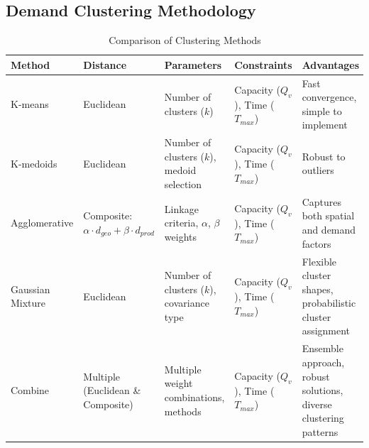 \subsection{Demand Clustering Methodology} \label{app:data:clustering}

\begin{table}[h]
\centering
\begin{tabular}{>{\raggedright}p{2.2cm}p{2.1cm}p{2.8cm}p{2.5cm}p{3.5cm}}
\toprule
Method & Distance & Parameters & Constraints & Advantages \\
\midrule
K-means & Euclidean & Number of clusters ($k$) & Capacity ($Q_v$), Time ($T_{max}$) & Fast convergence, simple to implement \\
\midrule
K-medoids & Euclidean & Number of clusters ($k$), medoid selection & Capacity ($Q_v$), Time ($T_{max}$) & Robust to outliers \\
\midrule
Agglomerative & Composite: $\alpha \cdot d_{geo} + \beta \cdot d_{prod}$ & Linkage criteria, $\alpha$, $\beta$ weights & Capacity ($Q_v$), Time ($T_{max}$) & Captures both spatial and demand factors \\
\midrule
Gaussian Mixture & Euclidean & Number of clusters ($k$), covariance type & Capacity ($Q_v$), Time ($T_{max}$) & Flexible cluster shapes, probabilistic cluster assignment \\
\midrule
Combine & Multiple (Euclidean \& Composite) & Multiple weight combinations, methods & Capacity ($Q_v$), Time ($T_{max}$) & Ensemble approach, robust solutions, diverse clustering patterns \\
\bottomrule
\end{tabular}
\caption{Comparison of Clustering Methods}
\label{tab:clustering-methods}
\end{table}

